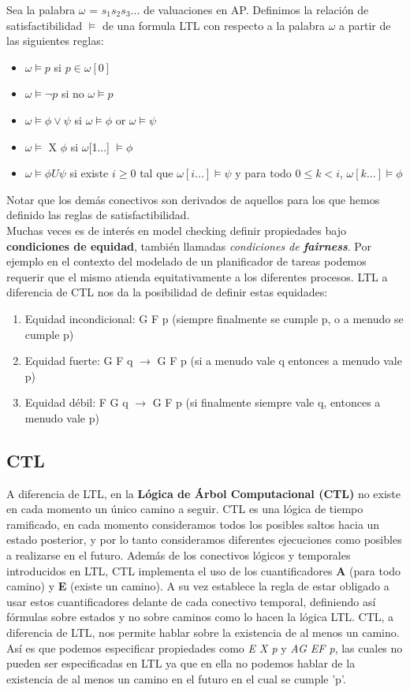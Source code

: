 \documentclass[titlepage, 12pt]{book}
\begin{document}
Sea la palabra $\omega$ = $s_1s_2s_3...$ de valuaciones en AP. Definimos la relaci\'on de satisfactibilidad $\models$ de una formula LTL con respecto a la palabra $\omega$ a partir de las siguientes reglas:
\begin{itemize}
\item $\omega \models p $ si $ p \in \omega[0]$
\item $\omega \models \neg p $ si no $\omega \models p$
\item $\omega \models \phi \vee \psi$ si $\omega \models \phi$ or $\omega \models \psi$
\item $\omega \models$ X $\phi$ si $\omega$[1...] $\models \phi$
\item $\omega \models \phi U \psi$ si existe $i \geq 0$ tal que  $\omega[i...] \models \psi$ y para todo $0 \leq k < i$, $\omega[k...] \models \phi$ 
\end{itemize}
Notar que los dem\'as conectivos son derivados de aquellos para los que hemos definido las reglas de satisfactibilidad. \\

Muchas veces es de inter\'es en model checking definir propiedades bajo \textbf{condiciones de equidad}, tambi\'en llamadas \textit{condiciones de \textbf{fairness}}. Por ejemplo en el contexto del modelado de un planificador de tareas podemos requerir que el mismo atienda equitativamente a los diferentes procesos. LTL a diferencia de CTL nos da la posibilidad de definir estas equidades:
\begin{enumerate}
\item Equidad incondicional: G F p (siempre finalmente se cumple p, o a menudo se cumple p)
\item Equidad fuerte: G F q $\rightarrow$ G F p (si a menudo vale q entonces a menudo vale p)
\item Equidad d\'ebil: F G q $\rightarrow$ G F p (si finalmente siempre vale q, entonces a menudo vale p)
\end{enumerate}


\subsection{CTL}
A diferencia de LTL, en la \textbf{L\'ogica de \'Arbol Computacional (CTL)} no existe en cada momento un \'unico camino a seguir. CTL es una l\'ogica de tiempo ramificado, en cada momento consideramos todos los posibles saltos hacia un estado posterior, y por lo tanto consideramos diferentes ejecuciones como posibles a realizarse en el futuro. Adem\'as de los conectivos l\'ogicos y temporales introducidos en LTL, CTL implementa el uso de los cuantificadores \textbf{A} (para todo camino) y \textbf{E} (existe un camino). A su vez establece la regla de estar obligado a usar estos cuantificadores delante de cada conectivo temporal, definiendo as\'i f\'ormulas sobre estados y no sobre caminos como lo hacen la l\'ogica LTL. CTL, a diferencia de LTL, nos permite hablar sobre la existencia de al menos un camino. As\'i es que podemos especificar propiedades como  \textit{E X p} y \textit{AG EF p}, las cuales no pueden ser especificadas en LTL ya que en ella no podemos hablar de la existencia de al menos un camino en el futuro en el cual se cumple 'p'.
\end{document}
